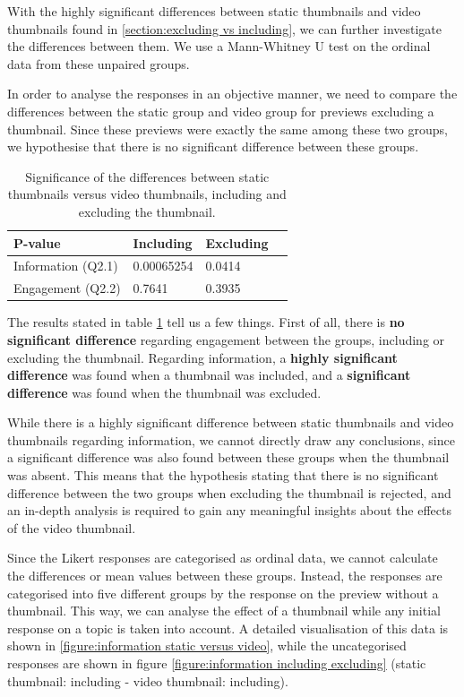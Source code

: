 \documentclass{../resources/sig-alternate-05-2015}
\begin{document}
With the highly significant differences between static thumbnails and video thumbnails found in \ref{section:excluding vs including}, we can further investigate the differences between them. We use a Mann-Whitney U test on the ordinal data from these unpaired groups.

In order to analyse the responses in an objective manner, we need to compare the differences between the static group and video group for previews excluding a thumbnail. Since these previews were exactly the same among these two groups, we hypothesise that there is no significant difference between these groups.

\begin{table}[h]
\centering
\caption{Significance of the differences between static thumbnails versus video thumbnails, including and excluding the thumbnail.}
\label{table: q2 significance}
\begin{tabular}{@{}llll@{}}
\textbf{P-value}   & \textbf{Including} & \textbf{Excluding} \\ \hline
Information (Q2.1) & \num{0.00065254}   & 0.0414             \\
Engagement (Q2.2)  & 0.7641             & 0.3935
\end{tabular}
\end{table}

The results stated in table \ref{table: q2 significance} tell us a few things. First of all, there is \textbf{no significant difference} regarding engagement between the groups, including or excluding the thumbnail. Regarding information, a \textbf{highly significant difference} was found when a thumbnail was included, and a \textbf{significant difference} was found when the thumbnail was excluded.

While there is a highly significant difference between static thumbnails and video thumbnails regarding information, we cannot directly draw any conclusions, since a significant difference was also found between these groups when the thumbnail was absent. This means that the hypothesis stating that there is no significant difference between the two groups when excluding the thumbnail is rejected, and an in-depth analysis is required to gain any meaningful insights about the effects of the video thumbnail.

Since the Likert responses are categorised as ordinal data, we cannot calculate the differences or mean values between these groups. Instead, the responses are categorised into five different groups by the response on the preview without a thumbnail. This way, we can analyse the effect of a thumbnail while any initial response on a topic is taken into account. A detailed visualisation of this data is shown in \ref{figure:information static versus video}, while the uncategorised responses are shown in figure \ref{figure:information including excluding} (static thumbnail: including - video thumbnail: including).
\end{document}
